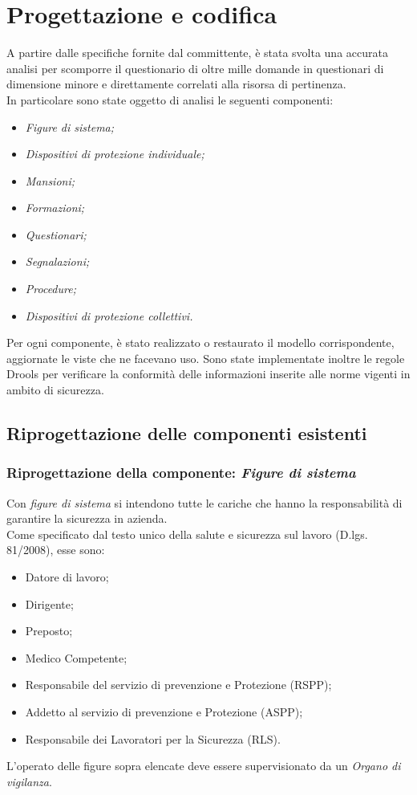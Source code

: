 \section{Progettazione e codifica}

A partire dalle specifiche fornite dal committente, è stata svolta una accurata analisi per scomporre il questionario di oltre mille domande in questionari di dimensione minore e direttamente correlati alla risorsa di pertinenza.\\
In particolare sono state oggetto di analisi le seguenti componenti:
\begin{itemize}
	\item \textit{Figure di sistema;}
	\item \textit{Dispositivi di protezione individuale;}
	\item \textit{Mansioni;}
	\item \textit{Formazioni;}
	\item \textit{Questionari;}
	\item \textit{Segnalazioni;}
	\item \textit{Procedure;}
	\item \textit{Dispositivi di protezione collettivi.}
\end{itemize}
Per ogni componente, è stato realizzato o restaurato il modello corrispondente, aggiornate le viste che ne facevano uso. Sono state implementate inoltre le regole Drools per verificare la conformità delle informazioni inserite alle norme vigenti in ambito di sicurezza.
\subsection{Riprogettazione delle componenti esistenti}
	
	
\subsubsection{Riprogettazione della componente: \textit{Figure di sistema}}

	Con \textit{figure di sistema} si intendono tutte le cariche che hanno la responsabilità di garantire la sicurezza in azienda. \\
	Come specificato dal testo unico della salute e sicurezza sul lavoro (D.lgs. 81/2008), esse sono: 
	\begin{itemize}
		\item Datore di lavoro;
		\item Dirigente;
		\item Preposto;
		\item Medico Competente;
		\item Responsabile del servizio di prevenzione e Protezione (RSPP);
		\item Addetto al servizio di prevenzione e Protezione (ASPP);
		\item Responsabile dei Lavoratori per la Sicurezza (RLS).
	\end{itemize}
	L'operato delle figure sopra elencate deve essere supervisionato da un \textit{Organo di vigilanza}.

